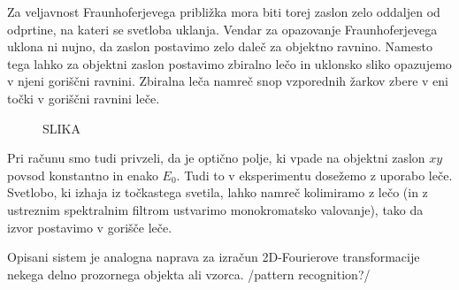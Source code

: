 Za veljavnost Fraunhoferjevega približka mora biti torej zaslon zelo
oddaljen od odprtine, na kateri se svetloba uklanja. Vendar za opazovanje 
Fraunhoferjevega uklona ni nujno, da zaslon postavimo zelo daleč za objektno ravnino.
Namesto tega lahko za objektni zaslon postavimo zbiralno lečo in uklonsko sliko opazujemo
v njeni goriščni ravnini. Zbiralna leča namreč snop vzporednih žarkov zbere v eni 
točki v goriščni ravnini leče. 
\begin{figure}[ht]
\centering
\def\svgwidth{120truemm} 
%
\caption{SLIKA}
\label{fig:05_2DFourier}
\end{figure}
Pri računu smo tudi privzeli, da je optično polje, ki vpade na objektni zaslon $xy$ povsod 
konstantno in enako $E_0$. Tudi to v eksperimentu dosežemo z uporabo leče. 
Svetlobo, ki izhaja iz točkastega svetila, lahko namreč kolimiramo z lečo (in z ustreznim
spektralnim filtrom ustvarimo monokromatsko valovanje), tako da izvor postavimo 
v gorišče leče.
\begin{remark}
Opisani sistem je analogna naprava za izračun 2D-Fourierove transformacije nekega 
delno prozornega objekta ali vzorca. /pattern recognition?/
\end{remark}

